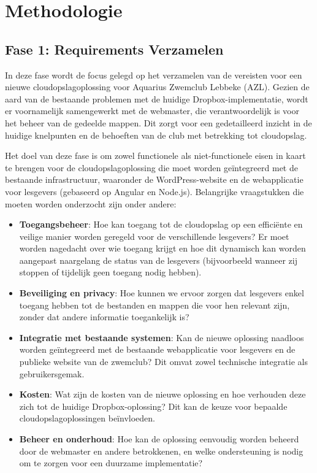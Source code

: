 \section{Methodologie}%
\label{sec:methodologie}

\subsection{Fase 1: Requirements Verzamelen}
In deze fase wordt de focus gelegd op het verzamelen van de vereisten voor een nieuwe cloudopslagoplossing voor Aquarius Zwemclub Lebbeke (AZL). Gezien de aard van de bestaande problemen met de huidige Dropbox-implementatie, wordt er voornamelijk samengewerkt met de webmaster, die verantwoordelijk is voor het beheer van de gedeelde mappen. Dit zorgt voor een gedetailleerd inzicht in de huidige knelpunten en de behoeften van de club met betrekking tot cloudopslag.

Het doel van deze fase is om zowel functionele als niet-functionele eisen in kaart te brengen voor de cloudopslagoplossing die moet worden geïntegreerd met de bestaande infrastructuur, waaronder de WordPress-website en de webapplicatie voor lesgevers (gebaseerd op Angular en Node.js). Belangrijke vraagstukken die moeten worden onderzocht zijn onder andere:
\begin{itemize}
    \item \textbf{Toegangsbeheer}: Hoe kan toegang tot de cloudopslag op een efficiënte en veilige manier worden geregeld voor de verschillende lesgevers? Er moet worden nagedacht over wie toegang krijgt en hoe dit dynamisch kan worden aangepast naargelang de status van de lesgevers (bijvoorbeeld wanneer zij stoppen of tijdelijk geen toegang nodig hebben).
    \item \textbf{Beveiliging en privacy}: Hoe kunnen we ervoor zorgen dat lesgevers enkel toegang hebben tot de bestanden en mappen die voor hen relevant zijn, zonder dat andere informatie toegankelijk is?
    \item \textbf{Integratie met bestaande systemen}: Kan de nieuwe oplossing naadloos worden geïntegreerd met de bestaande webapplicatie voor lesgevers en de publieke website van de zwemclub? Dit omvat zowel technische integratie als gebruikersgemak.
    \item \textbf{Kosten}: Wat zijn de kosten van de nieuwe oplossing en hoe verhouden deze zich tot de huidige Dropbox-oplossing? Dit kan de keuze voor bepaalde cloudopslagoplossingen beïnvloeden.
    \item \textbf{Beheer en onderhoud}: Hoe kan de oplossing eenvoudig worden beheerd door de webmaster en andere betrokkenen, en welke ondersteuning is nodig om te zorgen voor een duurzame implementatie?
\end{itemize}

